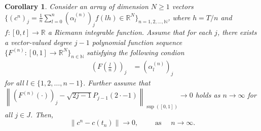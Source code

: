\documentclass{article}
\newtheorem{corollary}{Corollary}
\theoremstyle{definition}
\newcommand{\pr}[1]{ \left( #1 \right) }
\begin{document}
\begin{corollary} \label{cor:conv_to_quad}
    Consider an array of dimension $N\geq1$ vectors $\{\pr{c^n}_j = \frac{1}{n} \sum_{l=0}^n \pr{\alpha^{(n)}_l}_j f(lh) \in \mathbb{R}^N \}_{n=1,2, \dots, \mathbb{N}}$, where $h = T/n$ and $f \colon [0,t] \to \mathbb{R}$ a Riemann integrable function.
    Assume that for each $j$, there exists a vector-valued degree $j-1$ polynomial function sequence $\{F^{(n)} \colon [0,1] \to \mathbb{R}^N \}_{n \in \mathbb{N}}$
    satisfying the following condion
    \begin{align} \label{eq:F_condition}
        \pr{F \pr{\frac{l}{n}}}_j &= \pr{\alpha^{(n)}_l}_j
    \end{align}
    for all $l \in \{1, 2, \dots, n-1\}$.
    Further assume that $\left \|  \pr{F^{(n)}(\cdot)}_j - \sqrt{2j-1} P_{j-1} \pr{2\cdot-1} \right \|_{\sup([0,1])} \to 0$ holds as $n \to \infty$ for all $j \in J$. Then, 
    \[
\|c^n-c(t_n)\|\rightarrow 0,\qquad\text{ as } \quad n \rightarrow \infty.
    \]
\end{corollary}
\end{document}

